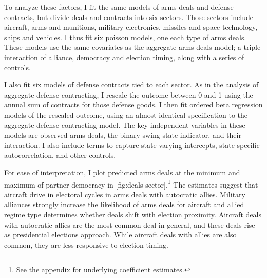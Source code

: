\documentclass[12pt]{article}
\begin{document}
To analyze these factors, I fit the same models of arms deals and defense contracts, but divide deals and contracts into six sectors. 
Those sectors include aircraft, arms and munitions, military electronics, missiles and space technology, ships and vehicles.  
I thus fit six poisson models, one each type of arms deals. 
These models use the same covariates as the aggregate arms deals model; a triple interaction of alliance, democracy and election timing, along with a series of controls. 


I also fit six models of defense contracts tied to each sector. 
As in the analysis of aggregate defense contracting, I rescale the outcome between 0 and 1 using the annual sum of contracts for those defense goods. 
I then fit ordered beta regression models of the rescaled outcome, using an almost identical specification to the aggregate defense contracting model.
The key independent variables in these models are observed arms deals, the binary swing state indicator, and their interaction. 
I also include terms to capture state varying intercepts, state-specific autocorrelation, and other controls. 


For ease of interpretation, I plot predicted arms deals at the minimum and maximum of partner democracy in \autoref{fig:deals-sector}.\footnote{See the appendix for underlying coefficient estimates.}
The estimates suggest that aircraft drive in electoral cycles in arms deals with autocratic allies. 
Military alliances strongly increase the likelihood of arms deals for aircraft and allied regime type determines whether deals shift with election proximity. 
Aircraft deals with autocratic allies are the most common deal in general, and these deals rise as presidential elections approach. 
While aircraft deals with allies are also common, they are less responsive to election timing. 
\end{document}
